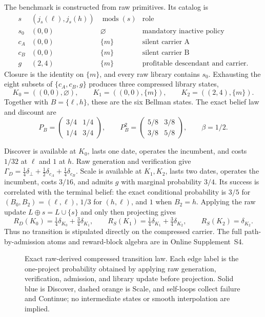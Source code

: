 The benchmark is constructed from raw primitives.  Its catalog is
\[
\begin{array}{c|c|c|l}
s&(j_s(\ell),j_s(h))&\operatorname{mods}(s)&\text{role}\\ \hline
s_0&(0,0)&\varnothing&\text{mandatory inactive policy}\\
c_A&(0,0)&\{m\}&\text{silent carrier A}\\
c_B&(0,0)&\{m\}&\text{silent carrier B}\\
g&(2,4)&\{m\}&\text{profitable descendant and carrier}.
\end{array}
\]
Closure is the identity on \(\{m\}\), and every raw library contains \(s_0\).
Exhausting the eight subsets of \(\{c_A,c_B,g\}\) produces three compressed
library states,
\[
 K_0=((0,0),\varnothing),\qquad
 K_1=((0,0),\{m\}),\qquad
 K_2=((2,4),\{m\}).
\]
Together with \(B=\{\ell,h\}\), these are the six Bellman states.  The exact
belief law and discount are
\begin{equation}\label{eq:canonical-belief-kernel}
 P_B=\begin{pmatrix}3/4&1/4\\[2pt]1/4&3/4\end{pmatrix},\qquad
 P_B^2=\begin{pmatrix}5/8&3/8\\[2pt]3/8&5/8\end{pmatrix},\qquad
 \beta=1/2.
\end{equation}

Discover is available at \(K_0\), lasts one date, operates the incumbent, and
costs \(1/32\) at \(\ell\) and \(1\) at \(h\).  Raw generation and verification
give
\(\Gamma_D=\tfrac14\delta_\bot+\tfrac12\delta_{c_A}
 +\tfrac14\delta_{c_B}\).
Scale is available at \(K_1,K_2\), lasts two dates, operates the incumbent,
costs \(3/16\), and admits \(g\) with marginal probability \(3/4\).  Its
success is correlated with the terminal belief: the exact conditional
probability is \(3/5\) for \((B_0,B_2)=(\ell,\ell)\), \(1/3\) for
\((h,\ell)\), and \(1\) when \(B_2=h\).  Applying the raw update
\(L\oplus s=L\cup\{s\}\) and only then projecting gives
\[
 R_D(K_0)=\tfrac14\delta_{K_0}+\tfrac34\delta_{K_1},\qquad
 R_S(K_1)=\tfrac14\delta_{K_1}+\tfrac34\delta_{K_2},\qquad
 R_S(K_2)=\delta_{K_2}.
\]
Thus no transition is stipulated directly on the compressed carrier.  The
full path-by-admission atoms and reward-block algebra are in Online
Supplement~S4.

\begin{figure}[htbp]
  \centering
  
  \caption{Exact raw-derived compressed transition law.  Each edge label is
  the one-project probability obtained by applying raw generation,
  verification, admission, and library update before projection.  Solid blue
  is Discover, dashed orange is Scale, and self-loops collect failure and
  Continue; no intermediate states or smooth interpolation are implied.}
  \label{fig:canonical-compressed-transition}
\end{figure}

